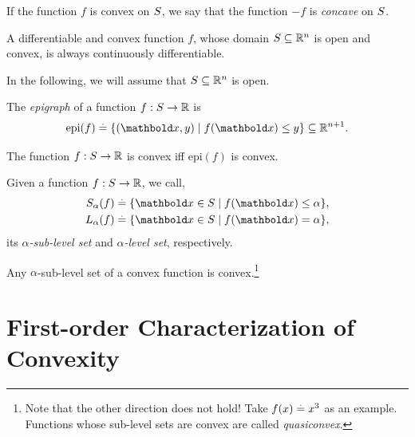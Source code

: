 \begin{rmk}
If the function $f$ is convex on $S$, we say that the function $-f$ is \emph{concave} on $S$.
\end{rmk}

\begin{lem} A differentiable and convex function $f$, whose domain $S \subseteq \mathbb{R}^n$ is open and convex, is always continuously differentiable.
\end{lem} In the following, we will assume that $S \subseteq \mathbb{R}^n$ is open.

\begin{defn}[Epigraph]
The \emph{epigraph} of a function $f : S \to \mathbb{R}$ is \begin{align}
    \mathrm{epi}(f) \defeq \{(\vx,y) \mid f(\vx) \leq y\} \subseteq \R^{n+1}.
\end{align}
\end{defn}
\begin{exc}\label{exc:convex_iff_epi_convex}
The function $f : S \to \mathbb{R}$ is convex iff $\mathrm{epi}(f)$ is convex.
\end{exc}

\begin{defn} Given a function $f : S \to \mathbb{R}$, we call, \begin{align}
    \sS_\alpha(f) &\defeq \{\vx \in \sS \mid f(\vx) \leq \alpha\}, \\
    \sL_\alpha(f) &\defeq \{\vx \in \sS \mid f(\vx) = \alpha\},
\end{align} its \emph{$\alpha$-sub-level set} and \emph{$\alpha$-level set}, respectively.
\end{defn}
\begin{exc}\label{exc:sub_level_set_of_convex_function_convex}
Any $\alpha$-sub-level set of a convex function is convex.\footnote{Note that the other direction does not hold! Take $f(x) \overset{.}{=} x^3$ as an example. Functions whose sub-level sets are convex are called \emph{quasiconvex}.}
\end{exc}

\section{First-order Characterization of Convexity}

